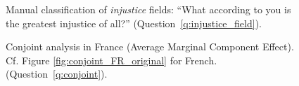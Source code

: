 \begin{figure}[h!]
    \caption[Manual classification of \textit{injustice} fields]{Manual classification of \textit{injustice} fields: ``What according to you is the greatest injustice of all?'' (Question~\ref{q:injustice_field}).
    }\label{fig:injustice_field}
\end{figure}

\begin{figure}[h!]
    \caption[Conjoint analysis in France]{Conjoint analysis in France (Average Marginal Component Effect). Cf. Figure \ref{fig:conjoint_FR_original} for French. \hfill (Question~\ref{q:conjoint}).
    }\label{fig:conjoint_FR}
\end{figure}

